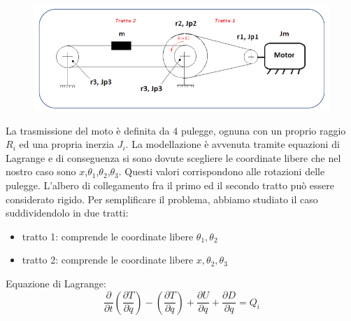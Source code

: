 \documentclass{article}
\begin{document}
\begin{figure}[H]
\centering
\includegraphics[width=.6\textwidth]{./assex/assex.png}
\end{figure}
La trasmissione del moto è definita da 4 pulegge, ognuna con un proprio raggio $R_{i}$ ed una propria inerzia $J_{i}$. La modellazione è avvenuta tramite equazioni di Lagrange e di conseguenza si sono dovute scegliere le coordinate libere che nel nostro caso sono $x$,$\theta_{1}$,$\theta_{2}$,$\theta_{3}$. 
Questi valori corrispondono alle rotazioni delle pulegge. L'albero di collegamento fra il primo ed il secondo tratto può essere considerato rigido. Per semplificare il problema, abbiamo studiato il caso suddividendolo in due tratti:
\begin{itemize}

\item tratto 1: comprende le coordinate libere $\theta_{1},\theta_{2}$
\item tratto 2: comprende le coordinate libere $x,\theta_{2},\theta_{3}$
\end{itemize}

Equazione di Lagrange: 
\begin{equation*}
\frac{\partial }{\partial t}(\frac{\partial T} {\partial \dot{q}}) - (\frac{\partial T}{\partial q}) + \frac{\partial U}{\partial q} + \frac{\partial D}{\partial \dot{q}} = Q_i
\end{equation*}
\end{document}
